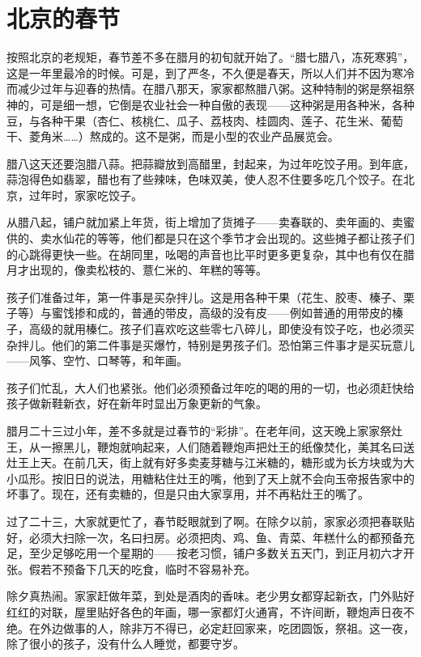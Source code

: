 \documentclass[12pt,UTF-8,openany]{ctexbook}
\begin{document}
\chapter{北京的春节}

\begin{large}
    
    按照北京的老规矩，春节差不多在腊月的初旬就开始了。“腊七腊八，冻死寒鸦”，这是一年里最冷的时候。可是，到了严冬，不久便是春天，所以人们并不因为寒冷而减少过年与迎春的热情。在腊八那天，家家都熬腊八粥。这种特制的粥是祭祖祭神的，可是细一想，它倒是农业社会一种自傲的表现——这种粥是用各种米，各种豆，与各种干果（杏仁、核桃仁、瓜子、荔枝肉、桂圆肉、莲子、花生米、葡萄干、菱角米……）熬成的。这不是粥，而是小型的农业产品展览会。
    
    腊八这天还要泡腊八蒜。把蒜瓣放到高醋里，封起来，为过年吃饺子用。到年底，蒜泡得色如翡翠，醋也有了些辣味，色味双美，使人忍不住要多吃几个饺子。在北京，过年时，家家吃饺子。
    
    从腊八起，铺户就加紧上年货，街上增加了货摊子——卖春联的、卖年画的、卖蜜供的、卖水仙花的等等，他们都是只在这个季节才会出现的。这些摊子都让孩子们的心跳得更快一些。在胡同里，吆喝的声音也比平时更多更复杂，其中也有仅在腊月才出现的，像卖松枝的、薏仁米的、年糕的等等。
    
    孩子们准备过年，第一件事是买杂拌儿。这是用各种干果（花生、胶枣、榛子、栗子等）与蜜饯掺和成的，普通的带皮，高级的没有皮——例如普通的用带皮的榛子，高级的就用榛仁。孩子们喜欢吃这些零七八碎儿，即使没有饺子吃，也必须买杂拌儿。他们的第二件事是买爆竹，特别是男孩子们。恐怕第三件事才是买玩意儿——风筝、空竹、口琴等，和年画。
    
    孩子们忙乱，大人们也紧张。他们必须预备过年吃的喝的用的一切，也必须赶快给孩子做新鞋新衣，好在新年时显出万象更新的气象。
    
    腊月二十三过小年，差不多就是过春节的“彩排”。在老年间，这天晚上家家祭灶王，从一擦黑儿，鞭炮就响起来，人们随着鞭炮声把灶王的纸像焚化，美其名曰送灶王上天。在前几天，街上就有好多卖麦芽糖与江米糖的，糖形或为长方块或为大小瓜形。按旧日的说法，用糖粘住灶王的嘴，他到了天上就不会向玉帝报告家中的坏事了。现在，还有卖糖的，但是只由大家享用，并不再粘灶王的嘴了。
    
    过了二十三，大家就更忙了，春节眨眼就到了啊。在除夕以前，家家必须把春联贴好，必须大扫除一次，名曰扫房。必须把肉、鸡、鱼、青菜、年糕什么的都预备充足，至少足够吃用一个星期的——按老习惯，铺户多数关五天门，到正月初六才开张。假若不预备下几天的吃食，临时不容易补充。
    
    除夕真热闹。家家赶做年菜，到处是酒肉的香味。老少男女都穿起新衣，门外贴好红红的对联，屋里贴好各色的年画，哪一家都灯火通宵，不许间断，鞭炮声日夜不绝。在外边做事的人，除非万不得已，必定赶回家来，吃团圆饭，祭祖。这一夜，除了很小的孩子，没有什么人睡觉，都要守岁。
    

\end{large}
\end{document}
